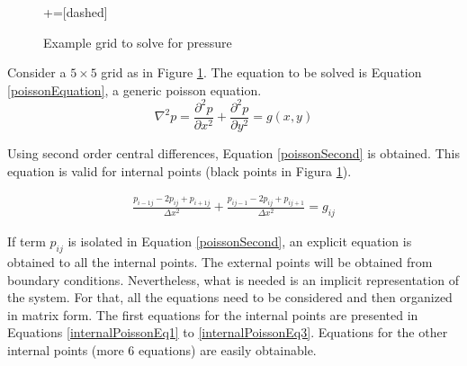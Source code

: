\documentclass[journal]{IEEEtran}
\begin{document}
\begin{figure}[!ht]
\centering
{}+=[dashed]%
\caption{Example grid to solve for pressure\label{examplePressureGrid}}
\end{figure}

Consider a $5\times 5$ grid as in Figure \ref{examplePressureGrid}. The equation to be solved is Equation \ref{poissonEquation}, a generic poisson equation. 
\begin{equation}
\nabla^2 p = \frac{\partial^2 p}{\partial x^2} + \frac{\partial^2 p}{\partial y^2} = g(x,y)\label{poissonEquation}
\end{equation}

Using second order central differences, Equation \ref{poissonSecond} is obtained. This equation is valid for internal points (black points in Figura \ref{examplePressureGrid}).

\begin{eqnarray}
\frac{p_{i-1j} - 2p_{ij} + p_{i+1j}}{\Delta x^2}	+ \frac{p_{ij-1} - 2p_{ij} + p_{ij+1}}{\Delta x^2} = g_{ij}\label{poissonSecond}
\end{eqnarray}

If term $p_{ij}$ is isolated in Equation \ref{poissonSecond}, an explicit equation is obtained to all the internal points. The external points will be obtained from boundary conditions. Nevertheless, what is needed is an implicit representation of the system. For that, all the equations need to be considered and then organized in matrix form. The first equations for the internal points are presented in Equations \ref{internalPoissonEq1} to \ref{internalPoissonEq3}. Equations for the other internal points (more 6 equations) are easily obtainable.
\end{document}
